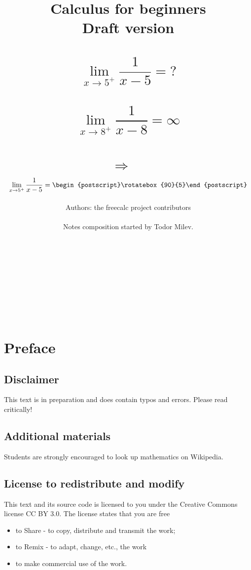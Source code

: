 \documentclass[12pt]{book}
\author{Authors: the freecalc project contributors \\~\\ Notes composition started by Todor Milev.}
\title{Calculus for beginners \\Draft version \\ ~\\
\[
\lim\limits_{x\to 5^+}\frac{1}{x-5}= ?
\]
~\\
\[
\lim\limits_{x\to 8^+}\frac{1}{x-8}=\infty
\]
~\\
$\Rightarrow$
~\\
\[
\lim\limits_{x\to 5^+}\frac{1}{x-5}= \begin{postscript}\rotatebox{90}{5}\end{postscript}
\]
}
\begin{document}
\maketitle

{
~

\bigskip

~

\bigskip

~

\bigskip

~

\bigskip

\begin{center}
\Huge{\color{red}}
\end{center}
} %



\chapter*{Preface}


\section*{Disclaimer}
This text is in preparation and does contain typos and errors. Please read critically!

\section*{Additional materials} Students are strongly encouraged to look up mathematics on Wikipedia.


\section*{License to redistribute and modify} This text and its source code is licensed to you under the Creative Commons license CC BY 3.0. The license states that you are free
\begin{itemize}
\item to Share - to copy, distribute and transmit the work;
\item to Remix - to adapt, change, etc., the work
\item to make commercial use of the work.
\end{itemize}
\end{document}
